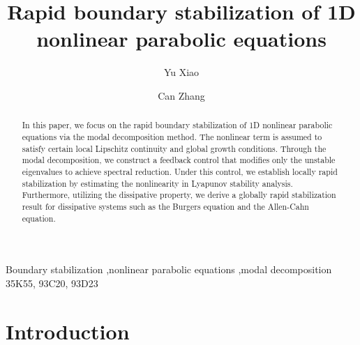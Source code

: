 \documentclass[review]{elsarticle}
\numberwithin{equation}{section}
\begin{document}
	\begin{frontmatter}
		\title{Rapid boundary stabilization of 1D nonlinear parabolic equations
		}
		
		\author[mysecondaryaddress]{Yu Xiao}
	    \medskip
	      \author[my4address]{Can Zhang}
		\address[mysecondaryaddress]{School of Mathematics and Statistics, Wuhan University, Wuhan 430072, P.R.China}
		\address[my4address]{School of Mathematics and Statistics, Wuhan University, Wuhan 430072, P.R.China}



        \begin{abstract}
	   In this paper, we focus on the rapid boundary stabilization of 1D nonlinear parabolic equations via the modal decomposition method. The nonlinear term is assumed to satisfy certain local Lipschitz continuity and global growth conditions. Through the
       modal decomposition, we construct a feedback control that modifies only the unstable eigenvalues to achieve spectral reduction. Under this control, we establish locally rapid stabilization by estimating the nonlinearity in Lyapunov stability analysis. Furthermore, utilizing the dissipative property, we derive a globally rapid stabilization result for dissipative systems such as the Burgers equation and the Allen-Cahn equation.
        \end{abstract}


        \begin{keyword}
	    Boundary stabilization \sep nonlinear parabolic equations \sep modal decomposition	
	    \medskip
	    \MSC[2020]  35K55, 93C20, 93D23
        \end{keyword}

    \end{frontmatter}

\section{Introduction}
\end{document}
